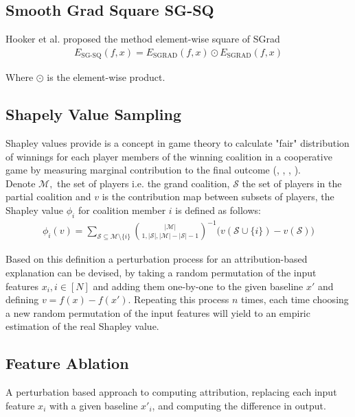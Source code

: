 \documentclass[12pt]{report}
\begin{document}
\subsection{Smooth Grad Square SG-SQ}
Hooker et al. \cite{https://doi.org/10.48550/arxiv.1806.10758} proposed the method element-wise square of SGrad 
\begin{align*}
	E_\text{SG-SQ}(f, x)  = E_\text{SGRAD}(f, x) \odot E_\text{SGRAD}(f, x)
\end{align*}

Where $\odot$ is the element-wise product.


\subsection{Shapely Value Sampling}
	Shapley values provide is a concept in game theory to calculate "fair" distribution of winnings for each player members of the winning coalition in a cooperative game by measuring marginal contribution to the final outcome (\cite{CASTRO20091726}, \cite{trumbelj2010AnEE} \cite{Shapley+2016+307+318}, \cite{https://doi.org/10.48550/arxiv.2104.12199}, \cite{https://doi.org/10.48550/arxiv.1903.10464}).\\
		
	Denote $\mathcal{M}, $ the set of players i.e. the grand coalition, $\mathcal{S}$ the set of players in the partial coalition and $v$ is the contribution map between subsets of players, the Shapley value $\phi_i$ for coalition member $i$ is defined as follows:
	\begin{align*}
		\phi_i(v)=  \sum_{\mathcal{S} \subseteq \mathcal{M} \setminus \{i\}} {|\mathcal{M}| \choose  1, |\mathcal{S}|, |\mathcal{M}| -|\mathcal{S}| -1}^{-1}\Big(v(\mathcal{S}\cup \{i\}) - v(\mathcal{S}) \Big)
	\end{align*}
	
	Based on this definition a perturbation process for an attribution-based explanation can be devised, by taking a random permutation of the input features $x_i, i \in [N]$ and adding them one-by-one to the given baseline $x'$ and defining $v=f(x)- f(x')$. Repeating this process $n$ times, each time choosing a new random permutation of the input features will yield to an empiric estimation of the real Shapley value.
	

\subsection{Feature Ablation}
   A perturbation based approach to computing attribution, replacing each input feature $x_i$ with a given baseline $x'_i$, and computing the difference in output. 
\end{document}
